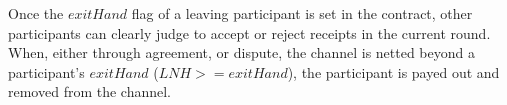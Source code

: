 Once the \(exitHand\) flag of a leaving participant is set in the contract, other participants can clearly judge to accept or reject receipts in the current round. When, either through agreement, or dispute, the channel is netted beyond a participant's \(exitHand\) (\(LNH >= exitHand\)), the participant is payed out and removed from the channel. 
